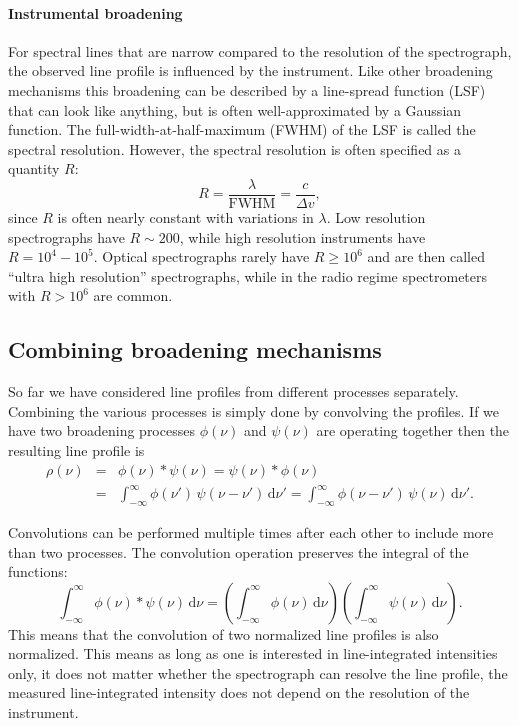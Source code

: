 \documentclass[12pt]{article}
\numberwithin{equation}{section}
\def\dd{\mathrm{d}}
\newcommand{\be}{\begin{equation}}
\newcommand{\ee}{\end{equation}}
\newcommand{\bea}{\begin{eqnarray}}
\newcommand{\eea}{\end{eqnarray}}
\begin{document}
\paragraph{Instrumental broadening}
For spectral lines that are narrow compared to the resolution of the spectrograph, the observed line profile is influenced by the instrument. Like other broadening mechanisms this broadening can be described by a line-spread function (LSF) that can look like anything, but is often well-approximated by a Gaussian function. The full-width-at-half-maximum (FWHM) of the LSF is called the spectral resolution. However, the spectral resolution is often specified as a quantity $R$:
\be
R = \frac{\lambda}{\mathrm{FWHM}} = \frac{c}{\Delta v},
\ee
since $R$ is often nearly constant with variations in $\lambda$. Low resolution spectrographs have $R\sim200$, while high resolution instruments have $R=10^4 - 10^5$. Optical spectrographs rarely have $R \geq 10^6$ and are then called ``ultra high resolution'' spectrographs, while in the radio regime spectrometers with $R>10^6$ are common.

\subsection{Combining broadening mechanisms} \label{subsec:combining_broadening}

So far we have considered line profiles from different processes separately. Combining the various processes is simply done by convolving the profiles. If we have two broadening processes $\phi(\nu)$ and $\psi(\nu)$ are operating together then the resulting line profile is
\bea
\rho(\nu) &=& \phi(\nu) * \psi(\nu) =\psi(\nu) * \phi(\nu) \nonumber \\
&= &\int_{-\infty}^\infty \phi(\nu') \, \psi(\nu-\nu') \, \dd \nu' =
 \int_{-\infty}^\infty \phi(\nu-\nu') \,  \psi(\nu) \, \dd \nu'.
\eea

Convolutions can be performed multiple times after each other to include more than two processes. The convolution operation preserves the integral of the functions:
\be
\int_{-\infty}^\infty \phi(\nu) * \psi(\nu) \, \dd \nu = 
	\left( \int_{-\infty}^\infty \phi(\nu)  \, \dd \nu \right) \left( \int_{-\infty}^\infty \psi(\nu) \, \dd \nu \right).
\ee
This means that the convolution of two normalized line profiles is also normalized. This means as long as one is interested in line-integrated intensities only, it does not matter whether the spectrograph can resolve the line profile, the measured line-integrated intensity does not depend on the resolution of the instrument.
\end{document}
